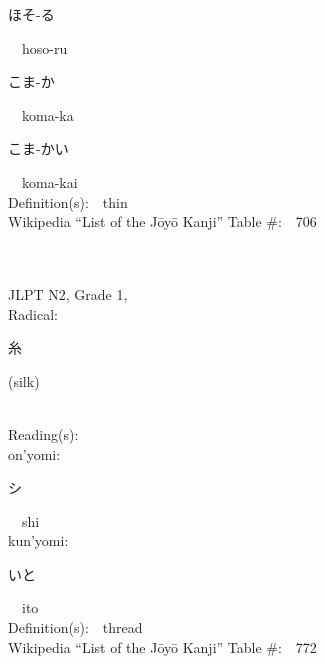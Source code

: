 \begin{multicols}{2}
{\hspace*{2em}}{\begin{CJK}{UTF8}{min} ほそ-る \end{CJK}}\ \ hoso-ru\ \ \\
{\hspace*{2em}}{\begin{CJK}{UTF8}{min} こま-か \end{CJK}}\ \ koma-ka\ \ \\
{\hspace*{2em}}{\begin{CJK}{UTF8}{min} こま-かい \end{CJK}}\ \ koma-kai\ \ \\
Definition(s):\ \ thin \\
Wikipedia ``List of the J\=oy\=o Kanji'' Table \#:\ \ 706 \\
\ \ \\
{\fontsize{34pt}{40pt}  }\ \ \\  %
{JLPT N2, Grade 1, \\Radical:\ \ {\begin{CJK}{UTF8}{min} 糸 \end{CJK}} (silk) } \\
Reading(s):\ \ \\
{\hspace*{1em}}on'yomi:\ \ \\
{\hspace*{2em}}{\begin{CJK}{UTF8}{min} シ \end{CJK}}\ \ shi\ \ \\
{\hspace*{1em}}kun'yomi:\ \ \\
{\hspace*{2em}}{\begin{CJK}{UTF8}{min} いと \end{CJK}}\ \ ito\ \ \\
Definition(s):\ \ thread \\
Wikipedia ``List of the J\=oy\=o Kanji'' Table \#:\ \ 772 \\
\ \ \\
{\fontsize{34pt}{40pt}  }\ \ \\  %

\end{multicols}
